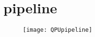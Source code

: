 
\chapter{\qpu{} pipeline} %

\label{AppendixD} %

\begin{figure}[!htbp]
	\centering
	\texttt{[image: QPUpipeline]}
\end{figure}
